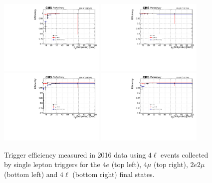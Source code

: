\begin{figure}[!htb]
	\vspace*{0.3cm}
	\begin{center}
		\includegraphics[width=0.45\textwidth]{Figures/Trigger/Histo_TrigEff_ptMin_4e.pdf} 
		\includegraphics[width=0.45\textwidth]{Figures/Trigger/Histo_TrigEff_ptMin_4mu.pdf} \\
		\includegraphics[width=0.45\textwidth]{Figures/Trigger/Histo_TrigEff_ptMin_2e2mu.pdf} 
		\includegraphics[width=0.45\textwidth]{Figures/Trigger/Histo_TrigEff_ptMin_4l.pdf} \\
		\caption{ %
		Trigger efficiency measured in 2016 data using $4\ell$ events collected by single lepton triggers for the $4e$ (top left), $4\mu$ (top right), $2e2\mu$ (bottom left) and $4\ell$ (bottom right) final states. 
			\label{fig:TrigEffC}}
	\end{center}
\end{figure}

